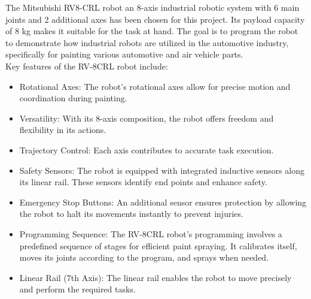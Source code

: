 The Mitsubishi RV8-CRL robot an 8-axis industrial robotic system with 6 main joints and 2 additional axes has been chosen for this project. Its payload capacity of 8 kg makes it suitable for the task at hand. The goal is to program the robot to demonstrate how industrial robots are utilized in the automotive industry, specifically for painting various automotive and air vehicle parts.\\
Key features of the RV-8CRL robot include:
\begin{itemize}
    
\item Rotational Axes: The robot's rotational axes allow for precise motion and coordination during painting.
\item Versatility: With its 8-axis composition, the robot offers freedom and flexibility in its actions.
\item Trajectory Control: Each axis contributes to accurate task execution.
\item Safety Sensors: The robot is equipped with integrated inductive sensors along its linear rail. These sensors identify end points and enhance safety.
\item Emergency Stop Buttons: An additional sensor ensures protection by allowing the robot to halt its movements instantly to prevent injuries.
\item Programming Sequence: The RV-8CRL robot's programming involves a predefined sequence of stages for efficient paint spraying. It calibrates itself, moves its joints according to the program, and sprays when needed.
\item Linear Rail (7th Axis): The linear rail enables the robot to move precisely and perform the required tasks.

\end{itemize}
